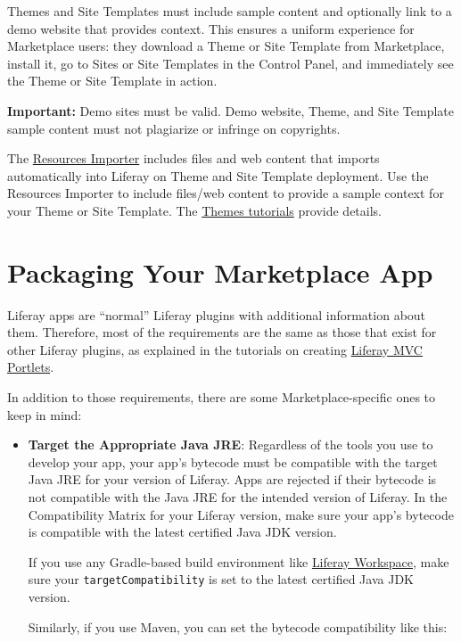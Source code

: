 Themes and Site Templates must include sample content and optionally
link to a demo website that provides context. This ensures a uniform
experience for Marketplace users: they download a Theme or Site Template
from Marketplace, install it, go to Sites or Site Templates in the
Control Panel, and immediately see the Theme or Site Template in action.

\noindent\hrulefill

\textbf{Important:} Demo sites must be valid. Demo website, Theme, and
Site Template sample content must not plagiarize or infringe on
copyrights.

\noindent\hrulefill

The
\href{/docs/7-2/frameworks/-/knowledge_base/f/importing-resources-with-a-theme}{Resources
Importer} includes files and web content that imports automatically into
Liferay on Theme and Site Template deployment. Use the Resources
Importer to include files/web content to provide a sample context for
your Theme or Site Template. The
\href{/docs/7-2/frameworks/-/knowledge_base/f/themes-introduction}{Themes
tutorials} provide details.

\section{Packaging Your Marketplace
App}\label{packaging-your-marketplace-app}

Liferay apps are ``normal'' Liferay plugins with additional information
about them. Therefore, most of the requirements are the same as those
that exist for other Liferay plugins, as explained in the tutorials on
creating
\href{/docs/7-2/appdev/-/knowledge_base/a/liferay-mvc-portlet}{Liferay
MVC Portlets}.

In addition to those requirements, there are some Marketplace-specific
ones to keep in mind:

\begin{itemize}
\item
  \textbf{Target the Appropriate Java JRE}: Regardless of the tools you
  use to develop your app, your app's bytecode must be compatible with
  the target Java JRE for your version of Liferay. Apps are rejected if
  their bytecode is not compatible with the Java JRE for the intended
  version of Liferay. In the Compatibility Matrix for your Liferay
  version, make sure your app's bytecode is compatible with the latest
  certified Java JDK version.

  If you use any Gradle-based build environment like
  \href{/docs/7-2/reference/-/knowledge_base/r/liferay-workspace}{Liferay
  Workspace}, make sure your \texttt{targetCompatibility} is set to the
  latest certified Java JDK version.

  Similarly, if you use Maven, you can set the bytecode compatibility
  like this:
\end{itemize}

